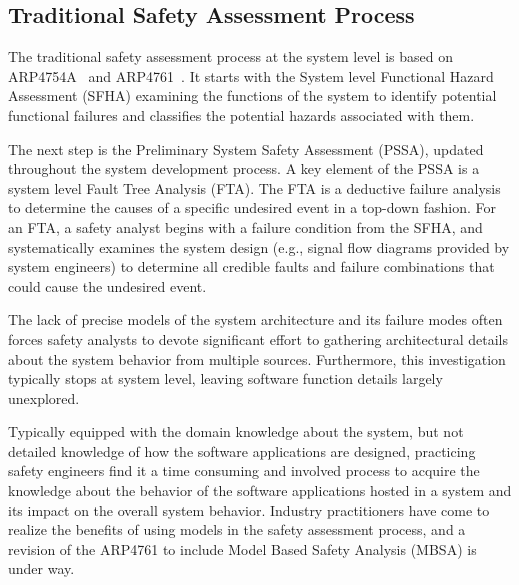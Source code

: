 \subsection{Traditional Safety Assessment Process}
\label{subsec:process}

The traditional safety assessment process at the system level is based on ARP4754A~\cite{SAE:ARP4754A} and ARP4761~\cite{SAE:ARP4761}. It starts with the System level Functional Hazard Assessment (SFHA) examining the functions of the system to identify potential functional failures and classifies the potential hazards associated with them. 

The next step is the Preliminary System Safety Assessment (PSSA), updated throughout the system development process. A key element of the PSSA is a system level Fault Tree Analysis (FTA).  The FTA is a deductive failure analysis to determine the causes of a specific undesired event in a top-down fashion. For an FTA, a safety analyst begins with a failure condition from the SFHA, and systematically examines the system design (e.g., signal flow diagrams provided by system engineers) to determine all credible faults and failure combinations that could cause the undesired event. 

The lack of precise models of the system architecture and its failure modes often forces safety analysts to devote significant effort to gathering architectural details about the system behavior from multiple sources. Furthermore, this investigation typically stops at system level, leaving software function details largely unexplored.

Typically equipped with the domain knowledge about the system, but not detailed knowledge of how the software applications are designed, practicing safety engineers find it a time consuming and involved process to acquire the knowledge about the behavior of the software applications hosted in a system and its impact on the overall system behavior.
Industry practitioners have come to realize the benefits of using models in the safety assessment process, and a revision of the ARP4761 to include Model Based Safety Analysis (MBSA) is under way.


